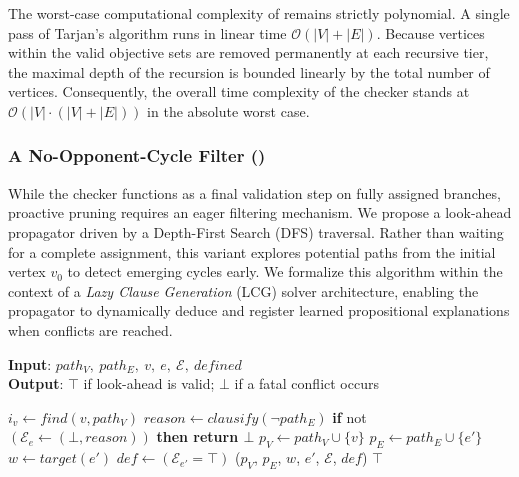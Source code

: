 \documentclass[a4paper,fleqn]{cas-sc}
\begin{document}
The worst-case computational complexity of \nocchecker remains strictly polynomial. A single pass of Tarjan’s algorithm runs in linear time $\mathcal{O}(|V| + |E|)$. Because vertices within the valid objective sets are removed permanently at each recursive tier, the maximal depth of the recursion is bounded linearly by the total number of vertices. Consequently, the overall time complexity of the checker stands at $\mathcal{O}(|V| \cdot (|V| + |E|))$ in the absolute worst case.

\subsubsection{A No-Opponent-Cycle Filter (\noceager)} \label{sec:nocfilter}

While the checker functions as a final validation step on fully assigned branches, proactive pruning requires an eager filtering mechanism. We propose a look-ahead propagator driven by a Depth-First Search (DFS) traversal. Rather than waiting for a complete assignment, this variant explores potential paths from the initial vertex $v_0$ to detect emerging cycles early. We formalize this algorithm within the context of a \textit{Lazy Clause Generation} (LCG) solver architecture, enabling the propagator to dynamically deduce and register learned propositional explanations when conflicts are reached.

\begin{algorithm}[htb]
\small
\caption{\textbf{\noceager}}
\textbf{Input}: $path_V,\ path_E,\ v,\ e,\ \mathcal{E},\ \textit{defined}$ \\
\textbf{Output}: $\top$ if look-ahead is valid; $\bot$ if a fatal conflict occurs
\begin{algorithmic}[1]
     \label{alg:noceager:pathcheck}
        \STATE $i_v \gets \textit{find}(v, path_V)$ \label{alg:noceager:findcycle}
         \label{alg:noceager:checkopponent}
            \STATE $\textit{reason} \gets \textit{clausify}(\neg path_E)$ \label{alg:noceager:reason}
            \STATE \textbf{if } not $(\mathcal{E}_e \gets (\bot, \textit{reason}))$ \textbf{then return $\bot$}
        \ENDIF
     \label{alg:noceager:defcheck}
         \label{alg:noceager:edgecheck}
            \STATE $p_V \gets path_V \cup \{v\}$
            \STATE $p_E \gets path_E \cup \{e'\}$
            \STATE $w \gets \textit{target}(e')$
            \STATE $\textit{def} \gets (\mathcal{E}_{e'} = \top)$
            \STATE \noceager($p_V$, $p_E$, $w$, $e'$, $\mathcal{E}$, $\textit{def}$)
        \ENDFOR
    \ENDIF
    \RETURN $\top$
\end{algorithmic}
\label{alg:noceager}
\end{algorithm}
\end{document}
